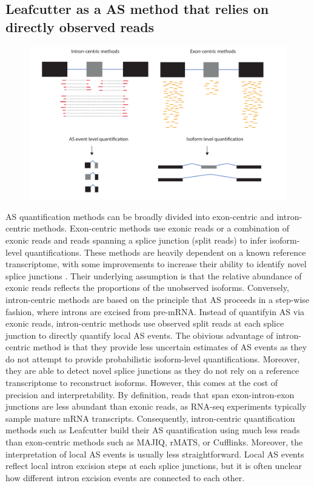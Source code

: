 \subsection{Leafcutter as a AS method that relies on directly observed reads}
\begin{figure}
    \centering
    \includegraphics[width=\textwidth]{intron_exon_centric}
    \caption{}
    \label{fig:intron_exon_centric}   
  \end{figure}
AS quantification methods can be broadly divided into exon-centric and intron-centric methods. Exon-centric methods use exonic reads or a combination of exonic reads and reads spanning a splice junction (split reads) to infer isoform-level quantifications. These methods are heavily dependent on a known reference transcriptome, with some improvements to increase their ability to identify novel splice junctions \cite{Vaquero-Garcia2016-dv}. Their underlying assumption is that the relative abundance of exonic reads reflects the proportions of the unobserved isoforms. Conversely, intron-centric methods are based on the principle that AS proceeds in a step-wise fashion, where introns are excised from pre-mRNA. Instead of quantifyin AS via exonic reads, intron-centric methods use observed split reads at each splice junction to directly quantify local AS events. The obivious advantage of intron-centric method is that they provide less uncertain estimates of AS events as they do not attempt to provide probabilistic isoform-level quantifications. Moreover, they are able to detect novel splice junctions as they do not rely on a reference transcriptome to reconstruct isoforms. However, this comes at the cost of precision and interpretability. By definition, reads that span exon-intron-exon junctions are less abundant than exonic reads, as RNA-seq experiments typically sample mature mRNA transcripts. Consequently, intron-centric quantification methods such as Leafcutter build their AS quantification using much less reads than exon-centric methods such as MAJIQ, rMATS, or Cufflinks. Moreover, the interpretation of local AS events is usually less straightforward. Local AS events reflect local intron excision steps at each splice junctions, but it is often unclear how different intron excision events are connected to each other. \\

